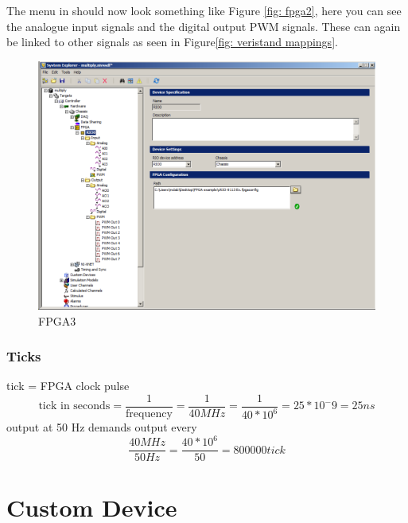\documentclass[a4paper,english]{report}
\begin{document}
The menu in should now look something like Figure \ref{fig: fpga2}, here you can see the analogue input signals and the digital output PWM signals. These can again be linked to other signals as seen in Figure\ref{fig: veristand mappings}.
\begin{figure}
	\includegraphics[scale=0.45]{fig/fpga3}
	\caption{FPGA3}
	\label{fig: fpga3}
\end{figure}
\subsubsection{Ticks}
tick = FPGA clock pulse
\[\text{tick in seconds}=\frac{1}{\text{frequency}}=\frac{1}{40MHz}=\frac{1}{40*10^{6}}=25*10^{-}9=25ns\]
output at 50 Hz demands output every 
\[\frac{40MHz}{50Hz}=\frac{40*10^{6}}{50}=800000tick\]
\section{Custom Device}
\end{document}
